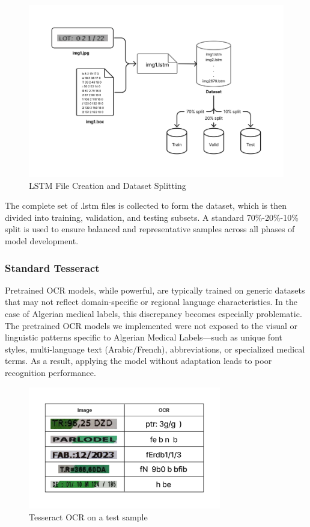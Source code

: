 \begin{figure}[H]
\centering
\includegraphics[width=\textwidth]{Figures/Chapter 3/Lstm_File_Creation.png}
\caption{LSTM File Creation and Dataset Splitting}
\label{fig:lstmfilecreation}
\end{figure}

The complete set of .lstm files is collected to form the dataset, which is then divided into training, validation, and testing subsets. A standard 70\%-20\%-10\% split is used to ensure balanced and representative samples across all phases of model development. 

\subsubsection{Standard Tesseract}

Pretrained OCR models, while powerful, are typically trained on generic datasets that may not reflect domain-specific or regional language characteristics. In the case of Algerian medical labels, this discrepancy becomes especially problematic. The pretrained OCR models we implemented were not exposed to the visual or linguistic patterns specific to Algerian Medical Labels—such as unique font styles, multi-language text (Arabic/French), abbreviations, or specialized medical terms. As a result, applying the model without adaptation leads to poor recognition performance.

\begin{figure}[H]
\centering
\includegraphics[width=0.75\textwidth]{Figures/Chapter 3/standard_tesseract_results.png}
\caption{Tesseract OCR on a test sample}
\label{fig:tesseractocrtestsample}
\end{figure}

